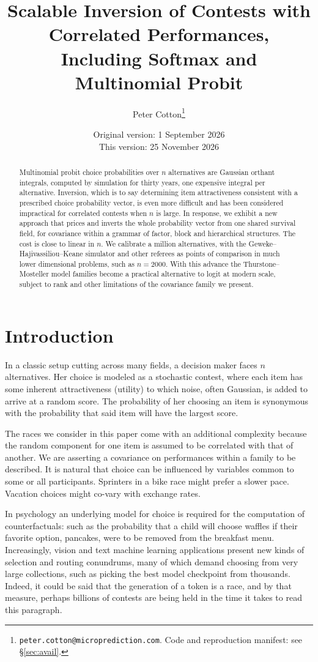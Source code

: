 \documentclass[11pt]{article}
\title{Scalable Inversion of Contests with Correlated Performances,\\
Including Softmax and Multinomial Probit}
\author{Peter Cotton\thanks{\texttt{peter.cotton@microprediction.com}. Code and
reproduction manifest: see \S\ref{sec:avail}.}}
\date{Original version: 1 September 2026\\ This version: 25 November 2026}
\begin{document}
\maketitle

\begin{abstract}
Multinomial probit choice probabilities over $n$ alternatives are
Gaussian orthant integrals, computed by simulation for thirty years, one
expensive integral per alternative. Inversion, which is to say determining item
attractiveness consistent with a prescribed choice probability vector, is even more difficult and has been
considered impractical for correlated contests when $n$ is large. In response, we exhibit a new approach that prices and inverts the whole probability vector from one shared survival field, for covariance within a grammar of factor, block and hierarchical structures. The cost is close to linear in $n$. We calibrate a million alternatives, with the Geweke--Hajivassiliou--Keane simulator and other referees as points of comparison in much lower dimensional problems, such as $n=2000$. With this advance the Thurstone--Mosteller model families
become a practical alternative to logit at modern scale, subject to rank and other limitations of the covariance family we present.
\end{abstract}

\section{Introduction}\label{sec:intro}

In a classic setup cutting across many fields, a decision maker faces $n$ alternatives. Her choice is modeled as a stochastic contest, where each item has some inherent attractiveness (utility) to which noise, often Gaussian, is added to arrive at a random score. The probability of her choosing an item is synonymous with the probability that said item will have the largest score.

The races we consider in this paper come with an additional complexity because the random component for one item is assumed to be correlated with that of another. We are asserting a covariance on performances within a family to be described. It is natural that choice can be influenced by variables common to some or all participants. Sprinters in a bike race might prefer a slower pace. Vacation choices might co-vary with exchange rates.

In psychology an underlying model for choice is required for the computation of counterfactuals: such as the probability that a child will choose waffles if their favorite option, pancakes, were to be removed from the breakfast menu. Increasingly, vision and text machine learning applications present new kinds of selection and routing conundrums, many of which demand choosing from very large collections, such as picking the best model checkpoint from thousands. Indeed, it could be said that the generation of a token is a race, and by that measure, perhaps billions of contests are being held in the time it takes to read this paragraph.
\end{document}
